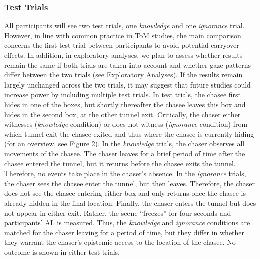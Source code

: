 \documentclass[
  english,
  man,floatsintext]{apa6}
\begin{document}
\hypertarget{test-trials}{%
\subsubsection{Test Trials}\label{test-trials}}

All participants will see two test trials, one \emph{knowledge} and one \emph{ignorance} trial. However, in line with common practice in ToM studies, the main comparison concerns the first test trial between-participants to avoid potential carryover effects. In addition, in exploratory analyses, we plan to assess whether results remain the same if both trials are taken into account and whether gaze patterns differ between the two trials (see Exploratory Analyses). If the results remain largely unchanged across the two trials, it may suggest that future studies could increase power by including multiple test trials.
In test trials, the chasee first hides in one of the boxes, but shortly thereafter the chasee leaves this box and hides in the second box, at the other tunnel exit. Critically, the chaser either witnesses (\emph{knowledge} condition) or does not witness (\emph{ignorance} condition) from which tunnel exit the chasee exited and thus where the chasee is currently hiding (for an overview, see Figure 2). In the \emph{knowledge} trials, the chaser observes all movements of the chasee. The chaser leaves for a brief period of time after the chasee entered the tunnel, but it returns before the chasee exits the tunnel. Therefore, no events take place in the chaser's absence. In the \emph{ignorance} trials, the chaser sees the chasee enter the tunnel, but then leaves. Therefore, the chaser does not see the chasee entering either box and only returns once the chasee is already hidden in the final location. Finally, the chaser enters the tunnel but does not appear in either exit. Rather, the scene ``freezes'' for four seconds and participants' AL is measured. Thus, the \emph{knowledge} and \emph{ignorance} conditions are matched for the chaser leaving for a period of time, but they differ in whether they warrant the chaser's epistemic access to the location of the chasee. No outcome is shown in either test trials.
\end{document}
